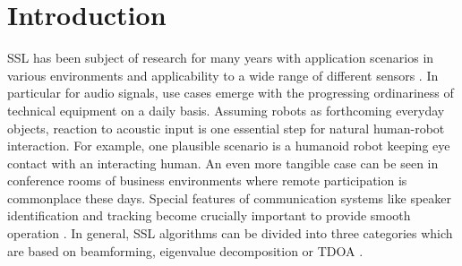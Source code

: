 \chapter{Introduction}
\label{chap:01_introduction}



\acf{SSL} has been subject of research for many years with application
scenarios in various environments and applicability to a wide range of
different sensors .
In particular for audio signals, use cases emerge with the progressing
ordinariness of technical equipment on a daily basis.
Assuming robots as forthcoming everyday objects, reaction to acoustic
input is one essential step for natural human-robot interaction.
For example, one plausible scenario is a humanoid robot keeping eye
contact with an interacting human.
An even more tangible case can be seen in conference rooms of business environments
where remote participation is commonplace these days.
Special features of communication systems like speaker identification and tracking
become crucially important to provide smooth operation \cite{Brandstein96apractical}.
In general, \ac{SSL} algorithms can be divided into three categories
which are based on beamforming, eigenvalue
decomposition or \ac{TDOA} \cite{Brandstein96apractical}.

